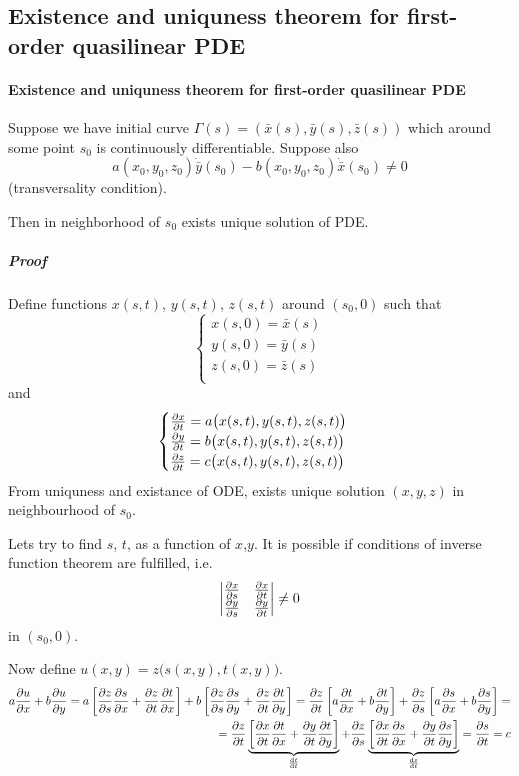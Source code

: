 \subsection{Existence and uniquness theorem for first-order quasilinear PDE}
\paragraph{Existence and uniquness theorem for first-order quasilinear PDE}
Suppose we have initial curve $\Gamma(s) = \left(\bar{x}(s), \bar{y}(s), \bar{z}(s) \right)$ which around some point $s_0$ is continuously differentiable. Suppose also
$$a(x_0,y_0,z_0) \dot{\bar{y}}(s_0) - b(x_0,y_0,z_0) \dot{\bar{x}}(s_0) \neq 0$$
(transversality condition). 

Then in neighborhood of $s_0$ exists unique solution of PDE.

\subparagraph{Proof}
Define functions $x(s,t)$, $y(s,t)$, $z(s,t)$ around $(s_0,0)$  such that
$$\begin{cases}
x(s,0) = \bar{x}(s)\\
y(s,0) = \bar{y}(s)\\
z(s,0) = \bar{z}(s)\\
\end{cases}$$
and
$$\begin{cases}
\pdv{x}{t} = a\big(x(s,t), y(s,t), z(s,t)\big)\\
\pdv{y}{t} = b\big(x(s,t), y(s,t), z(s,t)\big)\\
\pdv{z}{t} = c\big(x(s,t), y(s,t), z(s,t)\big)
\end{cases}$$
From uniquness and existance of ODE, exists unique solution $(x,y,z)$ in neighbourhood of $s_0$.

Lets try to find $s$, $t$, as a function of $x$,$y$. It is possible if conditions of inverse function theorem are fulfilled, i.e.\
$$\begin{vmatrix}
\pdv{x}{s}&\pdv{x}{t}\\
\pdv{y}{s}&\pdv{y}{t}\\
\end{vmatrix}\neq 0$$
in $(s_0,0)$.

Now define $u(x,y) = z\big(s(x,y), t(x,y)\big)$.
\begin{align*}
a\pdv{u}{x}+b\pdv{u}{y} = a\left[\pdv{z}{s}\pdv{s}{x}+\pdv{z}{t}\pdv{t}{x}\right]+b\left[\pdv{z}{s}\pdv{s}{y}+\pdv{z}{t}\pdv{t}{y}\right] = \pdv{z}{t} \left[a\pdv{t}{x} + b\pdv{t}{y}\right] + \pdv{z}{s} \left[a\pdv{s}{x} + b\pdv{s}{y}\right] =\\= \pdv{z}{t} \underbrace{\left[\pdv{x}{t}\pdv{t}{x} + \pdv{y}{t}\pdv{t}{y}\right]}_{\dv{t}{t}} + \pdv{z}{s} \underbrace{ \left[\pdv{x}{t}\pdv{s}{x} + \pdv{y}{t}\pdv{s}{y}\right]}_{\dv{s}{t}} = \pdv{s}{t} = c
\end{align*}
